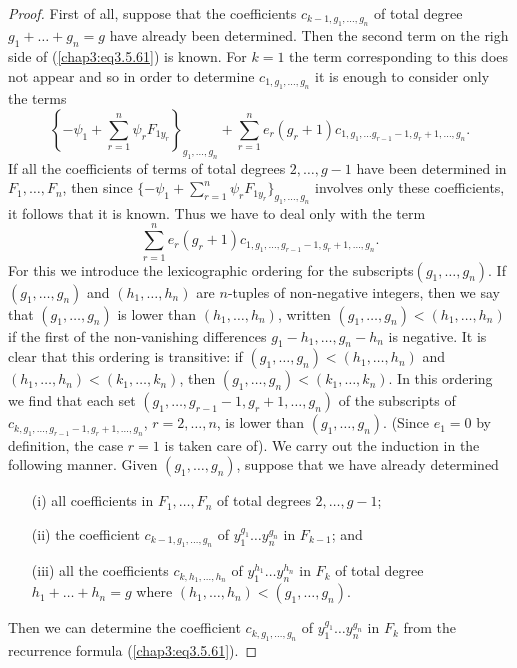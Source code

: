 \begin{proof}
First of all, suppose that the coefficients $c_{k-1, g_1, \ldots,
  g_n}$ of total degree $g_1 + \ldots + g_n = g$ have already been
determined. Then the second term on the righ side of
(\ref{chap3:eq3.5.61}) is known. For $k=1$ the term corresponding to
this does not appear and so in order to determine $c_{1, g_1, \ldots,
  g_n}$ it is enough to consider only the terms 
$$
\left\{-\psi_1 + \sum\limits^n_{r=1} \psi_r F_{1y_r} \right\}_{g_1,
  \ldots, g_n} + \sum\limits^n_{r=1} e_r(g_r+1) c_{1,g_1, \ldots
  g_{r-1} -1, g_r + 1, \ldots, g_n} .  
$$
If all the coefficients of terms of total degrees $2, \ldots, g-1$
have been determined in $F_1, \ldots, F_n$, then since $\{-\psi_1 +
\sum\limits^n_{r=1} \psi_r F_{1y_r}\}_{g_1, \ldots, g_n}$ involves
only these coefficients, it follows that it is known. Thus we have to
deal only with the term  
$$
\sum\limits^n_{r=1} e_r (g_r +1) c_{1, g_1 , \ldots, g_{r-1}  -1 ,
  g_r+1, \ldots,g_n}. 
$$\pageoriginale
For this we introduce the lexicographic ordering for the
subscripts\break $(g_1, \ldots, g_n)$. If $(g_1, \ldots, g_n)$ and
$(h_1, \ldots, h_n)$ are $n$-tuples of non-negative integers, then we
say that $(g_1, \ldots, g_n)$ is lower than $(h_1, \ldots,h_n)$,
written $(g_1, \ldots, g_n) < (h_1, \ldots, h_n)$ if the first of the
non-vanishing differences $g_1 - h_1, \ldots, g_n - h_n$ is
negative. It is clear that this ordering is transitive: if $(g_1,
\ldots, g_n) < (h_1, \ldots, h_n)$ and $(h_1, \ldots, h_n) < (k_1,
\ldots, k_n)$, then $(g_1, \ldots, g_n) < (k_1, \ldots, k_n)$. In this
ordering we find that each set $(g_1, \ldots, g_{r-1} -1, g_r + 1,
\ldots, g_n)$ of the subscripts  of $c_{k, g_1, \ldots, g_{r-1} -1,
  g_r + 1,\ldots, g_n}$, $r = 2, \ldots, n$, is lower than $(g_1,
\ldots, g_n)$. (Since $e_1 = 0$ by definition, the case $r=1$ is taken
care of). We carry out the induction in the following manner. Given
$(g_1, \ldots, g_n)$, suppose that we have already determined  
\begin{itemize}
\item[{\rm (i)}] all coefficients in $F_1, \ldots, F_n$ of total
  degrees $2, \ldots, g-1$; 

\item[{\rm (ii)}] the coefficient $c_{k-1, g_1, \ldots, g_n}$ of
  $y^{g_1}_1 \ldots y^{g_n}_n$ in $F_{k-1}$; and  

\item[{\rm (iii)}] all the coefficients $c_{k, h_1, \ldots, h_n}$ of
  $y^{h_1}_1 \ldots y^{h_n}_n$ in $F_k$ of total degree $h_1 + \ldots
  + h_n = g$ where $(h_1, \ldots, h_n) < (g_1 , \ldots, g_n)$.  
\end{itemize}
Then we can determine the coefficient $c_{k,g_1, \ldots, g_n}$ of
$y^{g_1}_1 \ldots y^{g_n}_n$ in $F_k$ from the recurrence formula
(\ref{chap3:eq3.5.61}). 


\end{proof}
